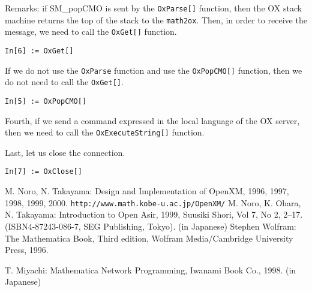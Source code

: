 \documentclass{article}
\begin{document}
Remarks: if SM\_popCMO is sent by the {\tt OxParse[]} function, then the
OX stack machine returns the top of the stack to the {\tt math2ox}.
Then, in order to receive the message, we need to call the {\tt OxGet[]}
function.
\begin{verbatim}
In[6] := OxGet[]
\end{verbatim}

If we do not use the {\tt OxParse} function and use the {\tt OxPopCMO[]}
function, then we do not need to call the {\tt OxGet[]}.
\begin{verbatim}
In[5] := OxPopCMO[]
\end{verbatim}

Fourth, if we send a command expressed in the local language of the OX
server, then we need to call the {\tt OxExecuteString[]} function.

Last, let us close the connection.
\begin{verbatim}
In[7] := OxClose[]
\end{verbatim}

\appendix

\begin{thebibliography}{99}
M. Noro, N. Takayama:
Design and Implementation of OpenXM, 1996, 1997, 1998, 1999, 2000.
{\footnotesize {\tt http://www.math.kobe-u.ac.jp/OpenXM/}}
M. Noro, K. Ohara, N. Takayama:
{Introduction to Open Asir}, 1999, Suusiki Shori, Vol 7, No 2,
2--17. (ISBN4-87243-086-7, SEG Publishing, Tokyo). (in Japanese)
Stephen Wolfram:
{The Mathematica Book}, Third edition,
Wolfram Media/Cambridge University Press, 1996.

T. Miyachi:
{Mathematica Network Programming},
Iwanami Book Co., 1998. (in Japanese)
\end{thebibliography}
\end{document}
